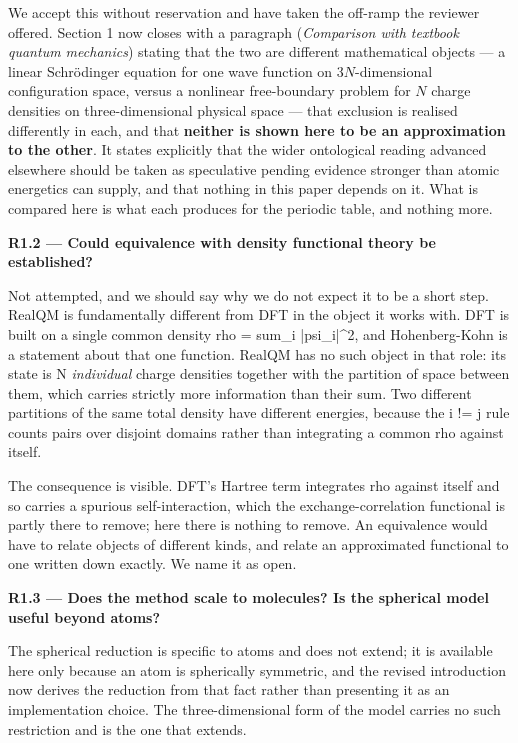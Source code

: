 \documentclass[11pt,a4paper]{article}
\begin{document}
We accept this without reservation and have taken the off-ramp the reviewer offered. Section 1
now closes with a paragraph (\emph{Comparison with textbook quantum mechanics}) stating that the
two are different mathematical objects --- a linear Schrödinger equation for one wave function on
$3N$-dimensional configuration space, versus a nonlinear free-boundary problem for $N$ charge
densities on three-dimensional physical space --- that exclusion is realised differently in each,
and that \textbf{neither is shown here to be an approximation to the other}. It states explicitly
that the wider ontological reading advanced elsewhere should be taken as speculative pending
evidence stronger than atomic energetics can supply, and that nothing in this paper depends on
it. What is compared here is what each produces for the periodic table, and nothing more.

\textbf{R1.2 --- Could equivalence with density functional theory be established?}

Not attempted, and we should say why we do not expect it to be a short step. RealQM is
fundamentally different from DFT in the object it works with. DFT is built on a single common
density rho = sum\_i |psi\_i|\textasciicircum{}2, and Hohenberg-Kohn is a statement about that one function. RealQM
has no such object in that role: its state is N \emph{individual} charge densities together with the
partition of space between them, which carries strictly more information than their sum. Two
different partitions of the same total density have different energies, because the i != j rule
counts pairs over disjoint domains rather than integrating a common rho against itself.

The consequence is visible. DFT's Hartree term integrates rho against itself and so carries a
spurious self-interaction, which the exchange-correlation functional is partly there to remove;
here there is nothing to remove. An equivalence would have to relate objects of different kinds,
and relate an approximated functional to one written down exactly. We name it as open.

\textbf{R1.3 --- Does the method scale to molecules? Is the spherical model useful beyond atoms?}

The spherical reduction is specific to atoms and does not extend; it is available here only
because an atom is spherically symmetric, and the revised introduction now derives the
reduction from that fact rather than presenting it as an implementation choice. The
three-dimensional form of the model carries no such restriction and is the one that extends.
\end{document}
